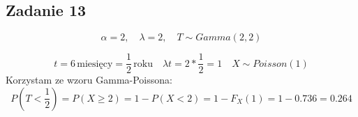 \subsection{Zadanie 13}
$$\alpha = 2,\quad \lambda = 2,\quad T \sim Gamma(2, 2)$$

$$t = 6\, \text{miesięcy} = \frac{1}{2}\, \text{roku}\quad
\lambda t = 2 * \frac{1}{2} = 1 \quad X \sim Poisson(1)$$
Korzystam ze wzoru Gamma-Poissona:
$$P(T < \frac{1}{2}) = P(X \geq 2) = 1 - P(X < 2) = 1 - F_X(1) = 1 - 0.736 = 0.264$$
